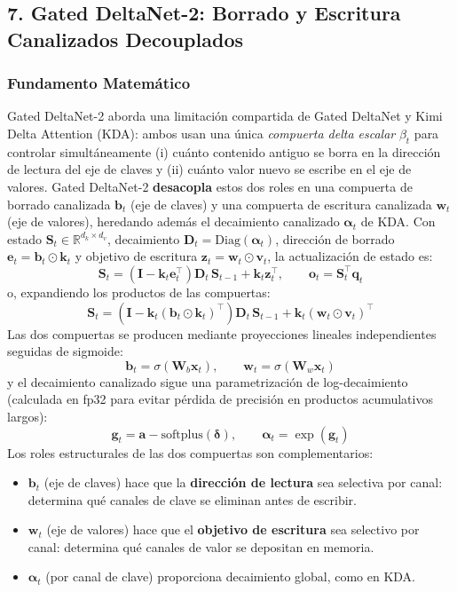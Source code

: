\normalsize

\subsection{7. Gated DeltaNet-2: Borrado y Escritura Canalizados Decouplados}

\subsubsection{Fundamento Matemático}

Gated DeltaNet-2 \citep{hatamizadeh_gated_deltanet2_2026} aborda una limitación compartida de Gated DeltaNet y Kimi Delta Attention (KDA): ambos usan una única \emph{compuerta delta escalar} $\beta_t$ para controlar simultáneamente (i) cuánto contenido antiguo se borra en la dirección de lectura del eje de claves y (ii) cuánto valor nuevo se escribe en el eje de valores. Gated DeltaNet-2 \textbf{desacopla} estos dos roles en una compuerta de borrado canalizada $\mathbf{b}_t$ (eje de claves) y una compuerta de escritura canalizada $\mathbf{w}_t$ (eje de valores), heredando además el decaimiento canalizado $\boldsymbol{\alpha}_t$ de KDA. Con estado $\mathbf{S}_t \in \mathbb{R}^{d_k \times d_v}$, decaimiento $\mathbf{D}_t = \mathrm{Diag}(\boldsymbol{\alpha}_t)$, dirección de borrado $\mathbf{e}_t = \mathbf{b}_t \odot \mathbf{k}_t$ y objetivo de escritura $\mathbf{z}_t = \mathbf{w}_t \odot \mathbf{v}_t$, la actualización de estado es:
\[
\mathbf{S}_t = \left(\mathbf{I} - \mathbf{k}_t \mathbf{e}_t^\top\right) \mathbf{D}_t \, \mathbf{S}_{t-1} + \mathbf{k}_t \mathbf{z}_t^\top, \qquad \mathbf{o}_t = \mathbf{S}_t^\top \mathbf{q}_t
\]
o, expandiendo los productos de las compuertas:
\[
\mathbf{S}_t = \left(\mathbf{I} - \mathbf{k}_t (\mathbf{b}_t \odot \mathbf{k}_t)^\top\right) \mathbf{D}_t \, \mathbf{S}_{t-1} + \mathbf{k}_t (\mathbf{w}_t \odot \mathbf{v}_t)^\top
\]
Las dos compuertas se producen mediante proyecciones lineales independientes seguidas de sigmoide:
\[
\mathbf{b}_t = \sigma(\mathbf{W}_b \mathbf{x}_t), \qquad \mathbf{w}_t = \sigma(\mathbf{W}_w \mathbf{x}_t)
\]
y el decaimiento canalizado sigue una parametrización de log-decaimiento (calculada en fp32 para evitar pérdida de precisión en productos acumulativos largos):
\[
\mathbf{g}_t = \mathbf{a} - \mathrm{softplus}(\boldsymbol{\delta}), \qquad \boldsymbol{\alpha}_t = \exp(\mathbf{g}_t)
\]
Los roles estructurales de las dos compuertas son complementarios:
\begin{itemize}[leftmargin=*]
    \item $\mathbf{b}_t$ (eje de claves) hace que la \textbf{dirección de lectura} sea selectiva por canal: determina qué canales de clave se eliminan antes de escribir.
    \item $\mathbf{w}_t$ (eje de valores) hace que el \textbf{objetivo de escritura} sea selectivo por canal: determina qué canales de valor se depositan en memoria.
    \item $\boldsymbol{\alpha}_t$ (por canal de clave) proporciona decaimiento global, como en KDA.
\end{itemize}
